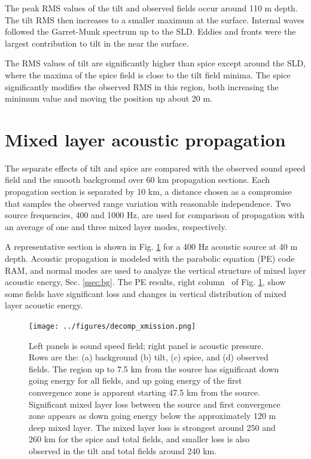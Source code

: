 \documentclass[preprint,NumberedRefs]{JASA}
\begin{document}
The peak RMS values of the tilt and observed fields occur around 110 m depth. The tilt RMS then increases to a smaller maximum at the surface. Internal waves followed the Garret-Munk spectrum up to the SLD. Eddies and fronts were the largest contribution to tilt in the near the surface.

The RMS values of tilt are significantly higher than spice except around the SLD, where the maxima of the spice field is close to the tilt field minima. The spice significantly modifies the observed RMS in this region, both increasing the minimum value and moving the position up about 20 m.

\section{\label{sec:propagation}Mixed layer acoustic propagation}
The separate effects of tilt and spice are compared with the observed sound speed field and the smooth background over 60 km propagation sections. Each propagation section is separated by 10 km, a distance chosen as a compromise that samples the observed range variation with reasonable independence. Two source frequencies, 400 and 1000 Hz, are used for comparison of propagation with an average of one and three mixed layer modes, respectively.

A representative section is shown in Fig. \ref{fig:decomp_x} for a 400 Hz acoustic source at 40 m depth. Acoustic propagation is modeled with the parabolic equation (PE) code RAM\citep{collins93}, and normal modes are used to analyze the vertical structure of mixed layer acoustic energy, Sec. \ref{ssec:bg}. The PE results, right column  of Fig. \ref{fig:decomp_x}, show some fields have significant loss and changes in vertical distribution of mixed layer acoustic energy.

\begin{figure}
\texttt{[image: ../figures/decomp\_xmission.png]}
    \caption{\label{fig:decomp_x}{Left panels is sound speed field; right panel is acoustic pressure. Rows are the: (a) background (b) tilt, (c) spice, and (d) observed fields. The region up to 7.5 km from the source has significant down going energy for all fields, and up going energy of the first convergence zone is apparent starting 47.5 km from the source. Significant mixed layer loss between the source and first convergence zone appears as down going energy below the approximately 120 m deep mixed layer. The mixed layer loss is strongest around 250 and 260 km for the spice and total fields, and smaller loss is also observed in the tilt and total fields around 240 km.}}
\end{figure}
\end{document}
